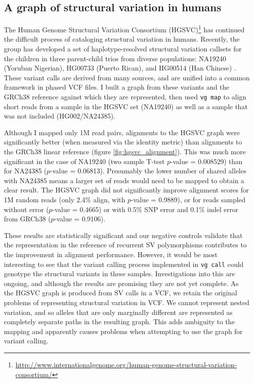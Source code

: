 \documentclass[a4paper,12pt,numbered,oneside]{Classes/PhDThesisPSnPDF}
\begin{document}
\subsection{A graph of structural variation in humans}

The Human Genome Structural Variation Consortium (HGSVC)\footnote{\url{http://www.internationalgenome.org/human-genome-structural-variation-consortium/}} has continued the difficult process of cataloging structural variation in humans.
Recently, the group has developed a set of haplotype-resolved structural variation callsets for the children in three parent-child trios from diverse populations: NA19240 (Yoruban Nigerian), HG00733 (Puerto Rican), and HG00514 (Han Chinese) \cite{chaisson2018multi}.
These variant calls are derived from many sources, and are unified into a common framework in phased VCF files.
I built a graph from these variants and the GRCh38 reference against which they are represented, then used {\tt vg map} to align short reads from a sample in the HGSVC set (NA19240) as well as a sample that was not included (HG002/NA24385).

Although I mapped only 1M read pairs, alignments to the HGSVC graph were significantly better (when measured via the identity metric) than alignments to the GRCh38 linear reference (figure \ref{fig:hgsvc_alignment}).
This was much more significant in the case of NA19240 (two sample T-test $p$-value = 0.008529) than for NA24385 ($p$-value = 0.06813).
Presumably the lower number of shared alleles with NA24385 means a larger set of reads would need to be mapped to obtain a clear result.
The HGSVC graph did not significantly improve alignment scores for 1M random reads (only 2.4\% align, with $p$-value = 0.9889), or for reads sampled without error ($p$-value = 0.4665) or with 0.5\% SNP error and 0.1\% indel error from GRCh38 ($p$-value = 0.9106).

These results are statistically significant and our negative controls validate that the representation in the reference of recurrent SV polymorphisms contributes to the improvement in alignment performance.
However, it would be most interesting to see that the variant calling process implemented in {\tt vg call} could genotype the structural variants in these samples.
Investigations into this are ongoing, and although the results are promising they are not yet complete.
As the HGSVC graph is produced from SV calls in a VCF, we retain the original problems of representing structural variation in VCF.
We cannot represent nested variation, and so alleles that are only marginally different are represented as completely separate paths in the resulting graph.
This adds ambiguity to the mapping and apparently causes problems when attempting to use the graph for variant calling.
\end{document}
